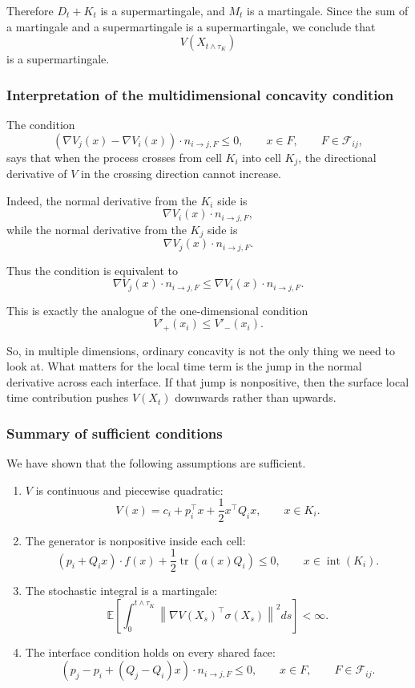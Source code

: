 Therefore $D_t + K_t$ is a supermartingale, and $M_t$ is a martingale. Since the
sum of a martingale and a supermartingale is a supermartingale, we conclude that
\[
V(X_{t \wedge \tau_K})
\]
is a supermartingale.

\subsubsection{Interpretation of the multidimensional concavity condition}

The condition
\[
\left(
\nabla V_j(x) - \nabla V_i(x)
\right)\cdot n_{i\to j,F}
\leq 0,
\qquad x \in F,
\qquad F\in\mathcal F_{ij},
\]
says that when the process crosses from cell $K_i$ into cell $K_j$, the
directional derivative of $V$ in the crossing direction cannot increase.

Indeed, the normal derivative from the $K_i$ side is
\[
\nabla V_i(x)\cdot n_{i\to j,F},
\]
while the normal derivative from the $K_j$ side is
\[
\nabla V_j(x)\cdot n_{i\to j,F}.
\]

Thus the condition is equivalent to
\[
\nabla V_j(x)\cdot n_{i\to j,F}
\leq
\nabla V_i(x)\cdot n_{i\to j,F}.
\]

This is exactly the analogue of the one-dimensional condition
\[
V'_+(x_i) \leq V'_-(x_i).
\]

So, in multiple dimensions, ordinary concavity is not the only thing we need to
look at. What matters for the local time term is the jump in the normal
derivative across each interface. If that jump is nonpositive, then the surface
local time contribution pushes $V(X_t)$ downwards rather than upwards.

\subsubsection{Summary of sufficient conditions}

We have shown that the following assumptions are sufficient.

\begin{enumerate}
\item $V$ is continuous and piecewise quadratic:
\[
V(x)
=
c_i + p_i^\top x + \frac{1}{2}x^\top Q_i x,
\qquad x \in K_i.
\]

\item The generator is nonpositive inside each cell:
\[
    (p_i + Q_i x)\cdot f(x)
    +
    \frac{1}{2}\operatorname{tr}\!\left(a(x)Q_i\right)
    \leq 0,
    \qquad x \in \operatorname{int}(K_i).
\]

\item The stochastic integral is a martingale:
\[
    \mathbb{E}\left[
    \int_0^{t \wedge \tau_K}
    \left\|
        \nabla V(X_s)^\top \sigma(X_s)
    \right\|^2 ds
    \right]
    < \infty.
\]

\item The interface condition holds on every shared face:
\[
    \left(
        p_j - p_i + (Q_j - Q_i)x
    \right)\cdot n_{i\to j,F}
    \leq 0,
    \qquad x \in F,
    \qquad F\in\mathcal F_{ij}.
\]
\end{enumerate}

